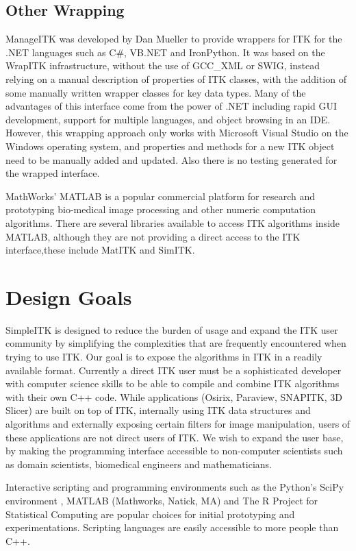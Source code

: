 \documentclass{frontiersMED} %
\begin{document}
\subsection{Other Wrapping}
ManageITK was developed by Dan Mueller \cite{Mueller2007} to provide
wrappers for ITK for the .NET languages such as C\#, VB.NET and
IronPython. It was based on the WrapITK infrastructure, without the
use of GCC\_XML or SWIG, instead relying on a manual description of
properties of ITK classes, with the addition of some manually written
wrapper classes for key data types. Many of the advantages of this
interface come from the power of .NET including rapid GUI development,
support for multiple languages, and object browsing in an
IDE. However, this wrapping approach only works with Microsoft Visual
Studio on the Windows operating system, and properties and methods for
a new ITK object need to be manually added and updated.  Also there is
no testing generated for the wrapped interface.

MathWorks' MATLAB is a popular commercial platform for research and
prototyping bio-medical image processing and other numeric computation
algorithms. There are several libraries available to access ITK
algorithms inside MATLAB, although they are not providing a direct
access to the ITK interface,these include MatITK\cite{Chu2006} and
SimITK\cite{Dickinson2011}.

\section{Design Goals}

SimpleITK is designed to reduce the burden of usage and expand the ITK
user community by simplifying the complexities that are frequently
encountered when trying to use ITK. Our goal is to expose the
algorithms in ITK in a readily available format. Currently a direct
ITK user must be a sophisticated developer with computer science
skills to be able to compile and combine ITK algorithms with their own
C++ code. While applications (Osirix, Paraview, SNAPITK, 3D Slicer)
are built on top of ITK, internally using ITK data structures and
algorithms and externally exposing certain filters for image
manipulation, users of these applications are not direct users of
ITK. We wish to expand the user base, by making the programming
interface accessible to non-computer scientists such as domain
scientists, biomedical engineers and mathematicians.

Interactive scripting and programming environments such as the
Python's SciPy environment \cite{Jones2001}, MATLAB (Mathworks, Natick, MA)
and The R Project for Statistical Computing are popular choices for
initial prototyping and experimentations. Scripting languages are
easily accessible to more people than C++.
\end{document}
